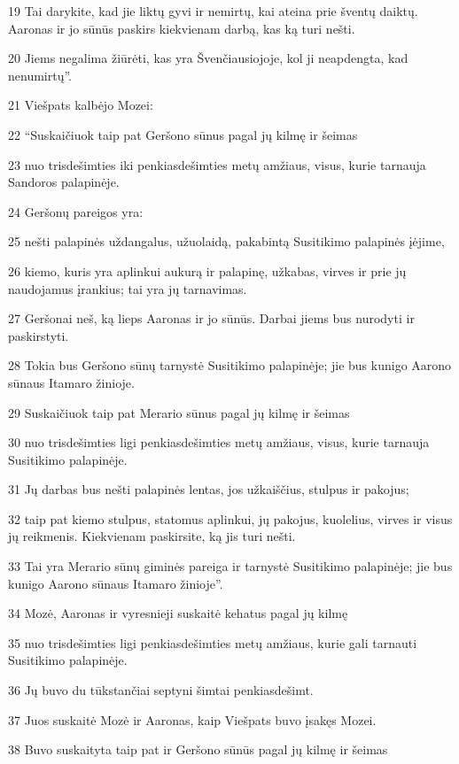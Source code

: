 \par 19 Tai darykite, kad jie liktų gyvi ir nemirtų, kai ateina prie šventų daiktų. Aaronas ir jo sūnūs paskirs kiekvienam darbą, kas ką turi nešti. 
\par 20 Jiems negalima žiūrėti, kas yra Švenčiausiojoje, kol ji neapdengta, kad nenumirtų”. 
\par 21 Viešpats kalbėjo Mozei: 
\par 22 “Suskaičiuok taip pat Geršono sūnus pagal jų kilmę ir šeimas 
\par 23 nuo trisdešimties iki penkiasdešimties metų amžiaus, visus, kurie tarnauja Sandoros palapinėje. 
\par 24 Geršonų pareigos yra: 
\par 25 nešti palapinės uždangalus, užuolaidą, pakabintą Susitikimo palapinės įėjime, 
\par 26 kiemo, kuris yra aplinkui aukurą ir palapinę, užkabas, virves ir prie jų naudojamus įrankius; tai yra jų tarnavimas. 
\par 27 Geršonai neš, ką lieps Aaronas ir jo sūnūs. Darbai jiems bus nurodyti ir paskirstyti. 
\par 28 Tokia bus Geršono sūnų tarnystė Susitikimo palapinėje; jie bus kunigo Aarono sūnaus Itamaro žinioje. 
\par 29 Suskaičiuok taip pat Merario sūnus pagal jų kilmę ir šeimas 
\par 30 nuo trisdešimties ligi penkiasdešimties metų amžiaus, visus, kurie tarnauja Susitikimo palapinėje. 
\par 31 Jų darbas bus nešti palapinės lentas, jos užkaiščius, stulpus ir pakojus; 
\par 32 taip pat kiemo stulpus, statomus aplinkui, jų pakojus, kuolelius, virves ir visus jų reikmenis. Kiekvienam paskirsite, ką jis turi nešti. 
\par 33 Tai yra Merario sūnų giminės pareiga ir tarnystė Susitikimo palapinėje; jie bus kunigo Aarono sūnaus Itamaro žinioje”. 
\par 34 Mozė, Aaronas ir vyresnieji suskaitė kehatus pagal jų kilmę 
\par 35 nuo trisdešimties ligi penkiasdešimties metų amžiaus, kurie gali tarnauti Susitikimo palapinėje. 
\par 36 Jų buvo du tūkstančiai septyni šimtai penkiasdešimt. 
\par 37 Juos suskaitė Mozė ir Aaronas, kaip Viešpats buvo įsakęs Mozei. 
\par 38 Buvo suskaityta taip pat ir Geršono sūnūs pagal jų kilmę ir šeimas 
